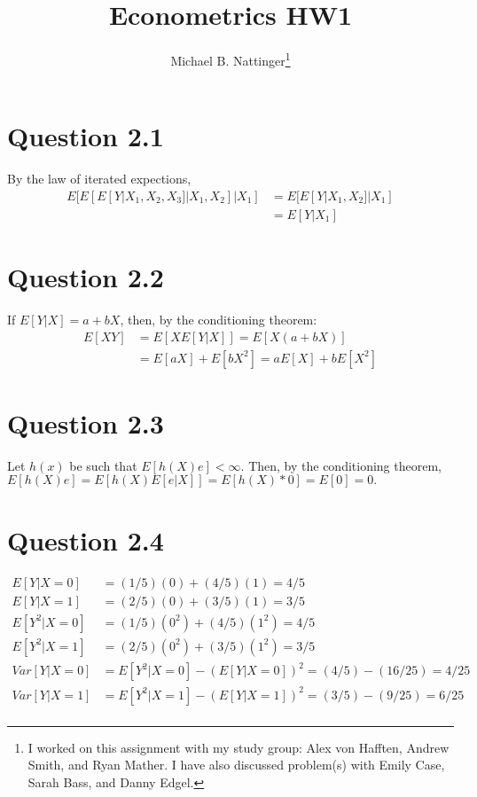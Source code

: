 \documentclass[11pt]{article} %
\title{Econometrics HW1}
\author{Michael B. Nattinger\footnote{I worked on this assignment with my study group: Alex von Hafften, Andrew Smith, and Ryan Mather. I have also discussed problem(s) with Emily Case, Sarah Bass, and Danny Edgel.}}
\begin{document}
\maketitle

\section{Question 2.1}
By the law of iterated expections,
\begin{align*}
E[E[E[Y|X_1,X_2,X_3]|X_1,X_2]|X_1] &= E[E[Y|X_1,X_2]|X_1]\\
&=E[Y|X_1]
\end{align*}
\section{Question 2.2}
If $E[Y|X] = a + bX$, then, by the conditioning theorem:
\begin{align*}
E[XY] &= E[XE[Y|X]] = E[X(a+bX)]\\
&= E[aX] + E[bX^2] = aE[X] + bE[X^2]
\end{align*}
\section{Question 2.3}
Let $h(x)$ be such that $E[h(X)e]<\infty$. Then, by the conditioning theorem, $E[h(X)e] = E[h(X)E[e|X]] = E[h(X)*0] = E[0] = 0.$
\section{Question 2.4}
\begin{align*}
E[Y|X=0] &= (1/5)(0) + (4/5)(1) = 4/5\\
 E[Y|X=1] &= (2/5)(0) + (3/5)(1) = 3/5\\
E[Y^2|X=0] &= (1/5)(0^2) + (4/5)(1^2) = 4/5\\
 E[Y^2|X=1] &= (2/5)(0^2) + (3/5)(1^2) = 3/5\\
Var[Y|X=0] &= E[Y^2|X=0] - (E[Y|X=0])^2 = (4/5) - (16/25) = 4/25\\
Var[Y|X=1] &= E[Y^2|X=1] - (E[Y|X=1])^2 = (3/5) - (9/25) = 6/25\\
\end{align*}
\end{document}
